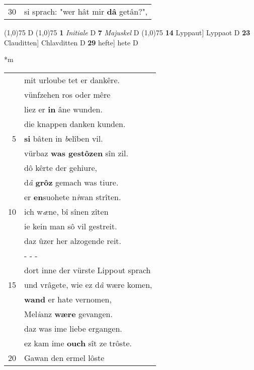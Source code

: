 \documentclass[8pt,a4paper,notitlepage]{article}
\begin{document}
\begin{table}[ht]
\begin{minipage}[t]{0.5\linewidth}
\begin{tabular}{rl}
30 & si sprach: "wer hât mir \textbf{dâ} getân?",\\ 
\end{tabular}
\scriptsize
\line(1,0){75} \newline
D \newline
\line(1,0){75} \newline
\textbf{1} \textit{Initiale} D  \textbf{7} \textit{Majuskel} D  \newline
\line(1,0){75} \newline
\textbf{14} Lyppaut] Lyppaot D \textbf{23} Clauditten] Chlavditten D \textbf{29} hefte] hete D \newline
\end{minipage}
\hspace{0.5cm}
\begin{minipage}[t]{0.5\linewidth}
\small
\begin{center}*m
\end{center}
\begin{tabular}{rl}
 & mit urloube tet er dankêre.\\ 
 & vünfzehen ros oder mêre\\ 
 & liez er \textbf{in} âne wunden.\\ 
 & die knappen danken kunden.\\ 
5 & \textbf{si} bâten in \textit{b}elîben vil.\\ 
 & vürbaz \textbf{was gestôzen} sîn zil.\\ 
 & dô kêrte der gehiure,\\ 
 & d\textit{â} \textbf{grôz} gemach was tiure.\\ 
 & er \textbf{en}suohete n\textit{i}wan strîten.\\ 
10 & ich w\textit{æ}ne, bî sînen zîten\\ 
 & ie kein man sô vil gestreit.\\ 
 & daz ûzer her alzogende reit.\\ 
 & \multicolumn{1}{l}{ - - - }\\ 
 & dort inne der vürste Lippo\textit{u}t sprach\\ 
15 & und vrâgete, wie ez d\textit{â} wære komen,\\ 
 & \textbf{wand} er hate vernomen,\\ 
 & Mel\textit{i}anz \textbf{wære} gevangen.\\ 
 & daz was ime liebe ergangen.\\ 
 & ez kam ime \textbf{ouch} sît ze trôste.\\ 
20 & Gawan den ermel lôste\\ 

\end{tabular}
\end{minipage}
\end{table}
\end{document}
